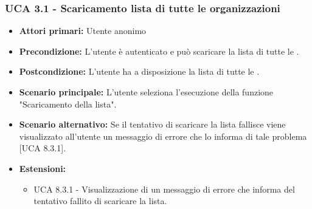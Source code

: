 \subsubsection{UCA 3.1 - Scaricamento lista di tutte le organizzazioni}%
\begin{itemize}
\item \textbf{Attori primari:} Utente anonimo
\item \textbf{Precondizione:} L'utente è autenticato e può scaricare la lista di tutte le .
\item \textbf{Postcondizione:} L'utente ha a disposizione la lista di tutte le .
\item \textbf{Scenario principale:} L'utente seleziona l'esecuzione della funzione "Scaricamento della lista".
\item \textbf{Scenario alternativo:} Se il tentativo di scaricare la lista fallisce viene visualizzato all'utente un messaggio di errore che lo informa di tale problema [UCA 8.3.1].
\item \textbf{Estensioni:}
	\begin{itemize}
	\item UCA 8.3.1 - Visualizzazione di un messaggio di errore che informa del tentativo fallito di scaricare la lista.
\end{itemize}
  
\end{itemize}

